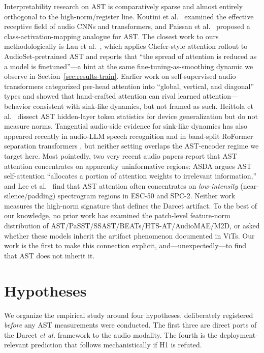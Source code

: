 \documentclass[conference]{IEEEtran}
\begin{document}
Interpretability research on AST is comparatively sparse and almost entirely orthogonal to the high-norm/register line. Koutini et al.\ \cite{koutini2021receptive} examined the effective receptive field of audio CNNs and transformers, and Paissan et al.\ \cite{paissan2022posthoc} proposed a class-activation-mapping analogue for AST. The closest work to ours methodologically is Lau et al.\ \cite{lau2024interpret}, which applies Chefer-style attention rollout to AudioSet-pretrained AST and reports that ``the spread of attention is reduced as a model is finetuned''---a hint at the same fine-tuning-as-smoothing dynamic we observe in Section~\ref{sec:results-train}. Earlier work on self-supervised audio transformers \cite{yang2020understanding,wu2021inputindep} categorized per-head attention into ``global, vertical, and diagonal'' types and showed that hand-crafted attention can rival learned attention---behavior consistent with sink-like dynamics, but not framed as such. Heittola et al.\ \cite{heittola2024frequency} dissect AST hidden-layer token statistics for device generalization but do not measure norms. Tangential audio-side evidence for sink-like dynamics has also appeared recently in audio-LLM speech recognition \cite{cappellazzo2025avsr} and in band-split RoFormer separation transformers \cite{han2025windowed}, but neither setting overlaps the AST-encoder regime we target here. Most pointedly, two very recent audio papers report that AST attention concentrates on apparently uninformative regions: ASDA \cite{lin2025asda} argues AST self-attention ``allocates a portion of attention weights to irrelevant information,'' and Lee et al.\ \cite{lee2025tokenpruning} find that AST attention often concentrates on \emph{low-intensity} (near-silence/padding) spectrogram regions in ESC-50 and SPC-2. Neither work measures the high-norm signature that defines the Darcet artifact. To the best of our knowledge, no prior work has examined the patch-level feature-norm distribution of AST/PaSST/SSAST/BEATs/HTS-AT/AudioMAE/M2D, or asked whether these models inherit the artifact phenomenon documented in ViTs. Our work is the first to make this connection explicit, and---unexpectedly---to find that AST does not inherit it.

\section{Hypotheses}

We organize the empirical study around four hypotheses, deliberately registered \emph{before} any AST measurements were conducted. The first three are direct ports of the Darcet \emph{et al.} framework to the audio modality. The fourth is the deployment-relevant prediction that follows mechanistically if H1 is refuted.
\end{document}
